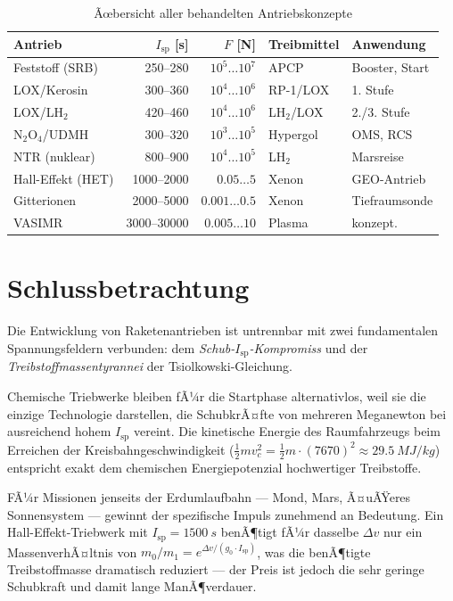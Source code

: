 ﻿\documentclass[12pt,a4paper]{article}
\newcommand{\Isp}{I_{\mathrm{sp}}}
\newcommand{\Dv}{\Delta v}
\begin{document}
\begin{table}[H]
\centering
\caption{Ãœbersicht aller behandelten Antriebskonzepte}
\label{tab:uebersicht}
\begin{tabular}{lrrll}
\toprule
\textbf{Antrieb} & \textbf{$\Isp$ [s]} & \textbf{$F$ [N]} &
\textbf{Treibmittel} & \textbf{Anwendung}\\
\midrule
Feststoff (SRB)   & 250--280  & $10^5\ldots10^7$ & APCP     & Booster, Start\\
LOX/Kerosin       & 300--360  & $10^4\ldots10^6$ & RP-1/LOX & 1. Stufe\\
LOX/LH$_2$        & 420--460  & $10^4\ldots10^6$ & LH$_2$/LOX& 2./3. Stufe\\
N$_2$O$_4$/UDMH   & 300--320  & $10^3\ldots10^5$ & Hypergol & OMS, RCS\\
NTR (nuklear)     & 800--900  & $10^4\ldots10^5$ & LH$_2$   & Marsreise\\
Hall-Effekt (HET) & 1000--2000 & $0.05\ldots5$   & Xenon    & GEO-Antrieb\\
Gitterionen       & 2000--5000 & $0.001\ldots0.5$& Xenon    & Tiefraumsonde\\
VASIMR            & 3000--30000& $0.005\ldots10$ & Plasma   & konzept.\\
\bottomrule
\end{tabular}
\end{table}

\section{Schlussbetrachtung}

Die Entwicklung von Raketenantrieben ist untrennbar mit zwei fundamentalen Spannungsfeldern
verbunden: dem \emph{Schub-$\Isp$-Kompromiss} und der \emph{Treibstoffmassentyrannei}
der Tsiolkowski-Gleichung.

Chemische Triebwerke bleiben fÃ¼r die Startphase alternativlos, weil sie die einzige
Technologie darstellen, die SchubkrÃ¤fte von mehreren Meganewton bei ausreichend hohem
$\Isp$ vereint. Die kinetische Energie des Raumfahrzeugs beim Erreichen der
Kreisbahngeschwindigkeit ($\frac{1}{2}mv_c^2 = \frac{1}{2}m\cdot(7670)^2 \approx
\SI{29.5}{MJ/kg}$) entspricht exakt dem chemischen Energiepotenzial hochwertiger
Treibstoffe.

FÃ¼r Missionen jenseits der Erdumlaufbahn --- Mond, Mars, Ã¤uÃŸeres Sonnensystem ---
gewinnt der spezifische Impuls zunehmend an Bedeutung. Ein Hall-Effekt-Triebwerk
mit $\Isp = \SI{1500}{s}$ benÃ¶tigt fÃ¼r dasselbe $\Dv$ nur ein MassenverhÃ¤ltnis von
$m_0/m_1 = e^{\Dv/(g_0\cdot\Isp)}$, was die benÃ¶tigte Treibstoffmasse dramatisch
reduziert --- der Preis ist jedoch die sehr geringe Schubkraft und damit lange
ManÃ¶verdauer.
\end{document}
